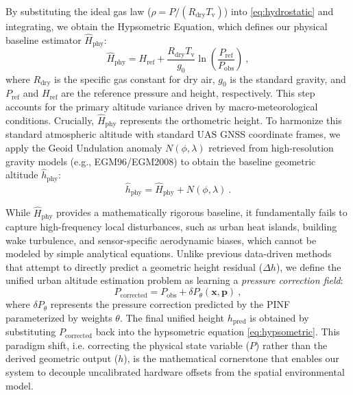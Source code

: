 By substituting the ideal gas law ($\rho = P / (R_\text{dry} T_\text{v})$) into \eqref{eq:hydrostatic} and integrating, we obtain the Hypsometric Equation, which defines our physical baseline estimator $\hat{H}_\text{phy}$:
\begin{equation}
\hat{H}_\text{phy} = H_\text{ref} + \frac{R_\text{dry} T_\text{v}}{g_0} \ln\left(\frac{P_\text{ref}}{P_\text{obs}}\right) \ ,
\label{eq:hypsometric}
\end{equation}
where $R_\text{dry}$ is the specific gas constant for dry air, $g_0$ is the standard gravity, and $P_\text{ref}$ and $H_\text{ref}$ are the reference pressure and height, respectively. This step accounts for the primary altitude variance driven by macro-meteorological conditions.
Crucially, $\hat{H}_\text{phy}$ represents the orthometric height. To harmonize this standard atmospheric altitude with standard UAS GNSS coordinate frames, we apply the Geoid Undulation anomaly $N(\phi, \lambda)$ retrieved from high-resolution gravity models (e.g., EGM96/EGM2008) to obtain the baseline geometric altitude $\hat{h}_\text{phy}$:
\begin{equation}
\hat{h}_\text{phy} = \hat{H}_\text{phy} + N(\phi, \lambda) \ .
\label{eq:geoid}
\end{equation}

While $\hat{H}_\text{phy}$ provides a mathematically rigorous baseline, it fundamentally fails to capture high-frequency local disturbances, such as urban heat islands, building wake turbulence, and sensor-specific aerodynamic biases, which cannot be modeled by simple analytical equations. 
Unlike previous data-driven methods that attempt to directly predict a geometric height residual ($\Delta h$), we define the unified urban altitude estimation problem as learning a \textit{pressure correction field}:
\begin{equation}
P_\text{corrected} = P_\text{obs} + \delta P_\theta(\mathbf{x}, \mathbf{p}) \ ,
\label{eq:problem_formulation}
\end{equation}
where $\delta P_\theta$ represents the pressure correction predicted by the PINF parameterized by weights $\theta$. The final unified height $h_\text{pred}$ is obtained by substituting $P_\text{corrected}$ back into the hypsometric equation \eqref{eq:hypsometric}. This paradigm shift, i.e. correcting the physical state variable ($P$) rather than the derived geometric output ($h$), is the mathematical cornerstone that enables our system to decouple uncalibrated hardware offsets from the spatial environmental model.


